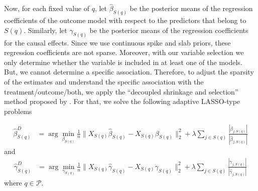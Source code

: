 \documentclass[preprint,12pt]{elsarticle}
\begin{document}
Now, for each fixed value of $q$, let $\hat{\beta}_{S(q)}$ be the posterior means 
of the regression coefficients of the outcome model with respect to
the predictors that belong to $S(q)$. Similarly,
let $\hat{\gamma}_{S(q)}$ be the posterior means of the regression
coefficients for the causal effects. Since we use continuous 
spike and slab priors, these regression coefficients are not sparse.
Moreover, with our variable selection we only determine whether the variable 
is included in at least one of the models. But, we cannot determine a specific 
association. Therefore, to adjust the sparsity of the estimates and understand
the specific association with the treatment/outcome/both, we apply the 
``decoupled shrinkage and selection'' method proposed by \citep{hahn2015}. 
For that, we solve the following adaptive LASSO-type \citep{Zou2006}
problems

\begin{align}
	\hat{\beta}^D_{S(q)} &= 
	\arg\min_{\beta_{S(q)}} \frac{1}{n}\|X_{S(q)}\hat{\beta}_{S(q)}
	- X_{S(q)} \beta_{S(q)}\|_2^2 + \lambda\sum_{j\in S(q)} 
	\frac{|\beta_{j,S(q)}|}{|\hat{\beta}_{j,S(q)}|}
\end{align}
and
\begin{align}
	\hat{\gamma}^D_{S(q)} &= 
	\arg\min_{\gamma_{S(q)}} \frac{1}{n}\|X_{S(q)}\hat{\gamma}_{S(q)}
	- X_{S(q)} \gamma_{S(q)}\|_2^2 + \lambda\sum_{j\in S(q)} 
	\frac{|\gamma_{j,S(q)}|}{|\hat{\gamma}_{j,S(q)}|}
\end{align}
where $q\in \mathcal{P}$.

\end{document}
